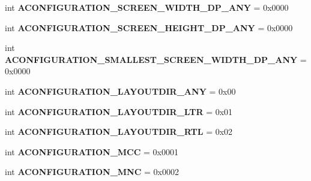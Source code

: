 \begin{DoxyCompactItemize}
int {\bfseries A\+C\+O\+N\+F\+I\+G\+U\+R\+A\+T\+I\+O\+N\+\_\+\+S\+C\+R\+E\+E\+N\+\_\+\+W\+I\+D\+T\+H\+\_\+\+D\+P\+\_\+\+A\+NY} = 0x0000
\item 
\mbox{\label{classconfiguration_1_1AConfiguration_aab20e000f5ea4c827d7df5044e535503}} 
int {\bfseries A\+C\+O\+N\+F\+I\+G\+U\+R\+A\+T\+I\+O\+N\+\_\+\+S\+C\+R\+E\+E\+N\+\_\+\+H\+E\+I\+G\+H\+T\+\_\+\+D\+P\+\_\+\+A\+NY} = 0x0000
\item 
\mbox{\label{classconfiguration_1_1AConfiguration_ac07b16642eab476debfbfb462470f1f9}} 
int {\bfseries A\+C\+O\+N\+F\+I\+G\+U\+R\+A\+T\+I\+O\+N\+\_\+\+S\+M\+A\+L\+L\+E\+S\+T\+\_\+\+S\+C\+R\+E\+E\+N\+\_\+\+W\+I\+D\+T\+H\+\_\+\+D\+P\+\_\+\+A\+NY} = 0x0000
\item 
\mbox{\label{classconfiguration_1_1AConfiguration_a755c75e237763b7652067604e1a9f6d5}} 
int {\bfseries A\+C\+O\+N\+F\+I\+G\+U\+R\+A\+T\+I\+O\+N\+\_\+\+L\+A\+Y\+O\+U\+T\+D\+I\+R\+\_\+\+A\+NY} = 0x00
\item 
\mbox{\label{classconfiguration_1_1AConfiguration_a21aae05f5d14e921e653da1469183128}} 
int {\bfseries A\+C\+O\+N\+F\+I\+G\+U\+R\+A\+T\+I\+O\+N\+\_\+\+L\+A\+Y\+O\+U\+T\+D\+I\+R\+\_\+\+L\+TR} = 0x01
\item 
\mbox{\label{classconfiguration_1_1AConfiguration_a31cca57cc4cc808840ff2f3edddad7d3}} 
int {\bfseries A\+C\+O\+N\+F\+I\+G\+U\+R\+A\+T\+I\+O\+N\+\_\+\+L\+A\+Y\+O\+U\+T\+D\+I\+R\+\_\+\+R\+TL} = 0x02
\item 
\mbox{\label{classconfiguration_1_1AConfiguration_ac9181336cfc99e494d3612b08a0125b3}} 
int {\bfseries A\+C\+O\+N\+F\+I\+G\+U\+R\+A\+T\+I\+O\+N\+\_\+\+M\+CC} = 0x0001
\item 
\mbox{\label{classconfiguration_1_1AConfiguration_adfb7fd9059288593024bd988a39916cd}} 
int {\bfseries A\+C\+O\+N\+F\+I\+G\+U\+R\+A\+T\+I\+O\+N\+\_\+\+M\+NC} = 0x0002
\item 
\mbox{\label{classconfiguration_1_1AConfiguration_acaaf4201c0c51d54443e030a048c08e1}} 

\end{DoxyCompactItemize}
